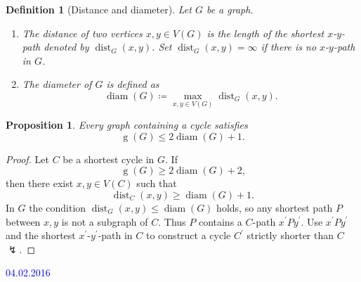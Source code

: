 \documentclass[a4paper]{article}
\newcommand{\lecture}{\vspace{5mm}\textcolor{blue}}
\newcounter{cnt} \numberwithin{cnt}{section}
\newtheorem*{defi*}{Definition}
\newtheorem{prop}[cnt]{Proposition}
\DeclareMathOperator{\girth}{g}
\DeclareMathOperator{\dist}{dist}
\DeclareMathOperator{\diam}{diam}
\begin{document}
\begin{defi*}[Distance and diameter]
  Let $G$ be a graph.
  \begin{enumerate}[label=(\alph*)]
    \item The \emph{distance of two vertices} $x,y \in V(G)$ is the length of the shortest $x$-$y$-path denoted by $\dist_G(x,y)$.
    Set $\dist_G(x,y) = \infty$ if there is no $x$-$y$-path in $G$.
    \item The diameter of $G$ is defined as
    \[ \diam(G) \coloneqq \max_{x,y \in V(G)} \dist_G(x,y) \text{.} \]
  \end{enumerate}
\end{defi*}

\begin{prop}
  Every graph containing a cycle satisfies 
  \[ \girth(G) \leq 2 \diam(G) + 1 \text{.} \]
\end{prop}

\begin{proof}
  Let $C$ be a shortest cycle in $G$.
  If 
  \[ \girth(G) \geq 2 \diam(G) + 2 \text{,} \]
  then there exist $x,y \in V(C)$ such that
  \[ \dist_C(x,y) \geq \diam(G) + 1 \text{.} \]
  In $G$ the condition $\dist_G(x,y) \leq \diam(G)$ holds, so any shortest path $P$ between $x,y$ is not a subgraph of $C$.
  Thus $P$ contains a $C$-path $x^\prime P y^\prime$.
  Use $x^\prime P y^\prime$ and the shortest $x^\prime$-$y^\prime$-path in $C$ to construct a cycle $C^\prime$ strictly shorter than $C$ $\lightning$.
\end{proof}


\lecture{04.02.2016}
\end{document}
